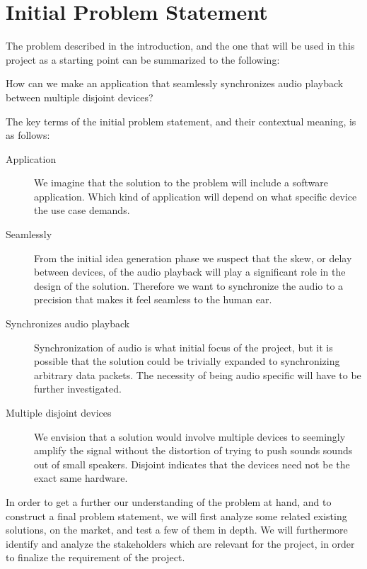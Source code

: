 \section{Initial Problem Statement}\label{sec:initial_problem}

The problem described in the introduction, and the one that will be used
in this project as a starting point can be summarized to the following:

\begin{problemstatement}
	How can we make an application that seamlessly synchronizes audio
	playback between multiple disjoint devices?
\end{problemstatement}

The key terms of the initial problem statement, and their contextual meaning,
is as follows:
\begin{description}
	\item[Application] We
		imagine that the solution to the problem will include a software
		application. Which kind of application will depend on what specific
		device the use case demands.
	\item[Seamlessly] From the initial idea generation phase we suspect
		that the skew, or delay between devices, of the audio playback will
		play a significant role in the design of the solution. Therefore we
		want to synchronize the audio to a precision that makes it feel
		seamless to the human ear.
	\item[Synchronizes audio playback] Synchronization of audio is what initial focus of
		the project, but it is possible that the solution could be trivially
		expanded to synchronizing arbitrary data packets. The necessity of
		being audio specific will have to be further investigated.
	\item[Multiple disjoint devices] We envision that
		a solution would involve multiple devices to seemingly amplify the
		signal without the distortion of trying to push sounds sounds out of
		small speakers. Disjoint indicates that the devices need not be the 
		exact same hardware. 
\end{description}

In order to get a further our understanding of the problem at hand, and to construct
a final problem statement, we will first analyze some related existing solutions,
on the market, and test a few of them in depth. We will furthermore identify and
analyze the stakeholders which are relevant for the project, in order to finalize
the requirement of the project.
